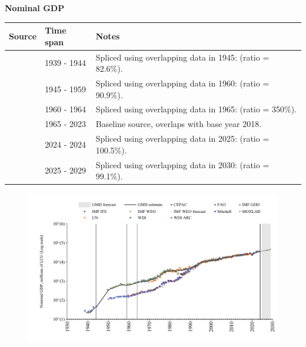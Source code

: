 \documentclass[12pt,a4paper,landscape]{article}
\begin{document}
\begin{adjustbox}{max totalsize={\paperwidth}{\paperheight},center}
\begin{minipage}[t][\textheight][t]{\textwidth}
\vspace*{0.5cm}
{}
\begin{center}
{\Large\bfseries Nominal GDP}
\end{center}
\vspace{0.5cm}
\begin{table}[H]
\centering
\small
\begin{tabular}{|l|l|l|}
\hline
\textbf{Source} & \textbf{Time span} & \textbf{Notes} \\
\hline
\rowcolor{white}\cite{Mitchell}& 1939 - 1944 &Spliced using overlapping data in 1945: (ratio = 82.6\%). \\
\rowcolor{lightgray}\cite{IMF_GDD}& 1945 - 1959 &Spliced using overlapping data in 1960: (ratio = 90.9\%). \\
\rowcolor{white}\cite{WDI_ARC}& 1960 - 1964 &Spliced using overlapping data in 1965: (ratio = 350\%). \\
\rowcolor{lightgray}\cite{WDI}& 1965 - 2023 &Baseline source, overlaps with base year 2018. \\
\rowcolor{white}\cite{IMF_IFS}& 2024 - 2024 &Spliced using overlapping data in 2025: (ratio = 100.5\%). \\
\rowcolor{lightgray}\cite{IMF_WEO_forecast}& 2025 - 2029 &Spliced using overlapping data in 2030: (ratio = 99.1\%). \\
\hline
\end{tabular}
\end{table}
\begin{figure}[H]
\centering
\includegraphics[width=\textwidth,height=0.6\textheight,keepaspectratio]{graphs/SLV_nGDP.pdf}
\end{figure}
\end{minipage}
\end{adjustbox}
\end{document}
